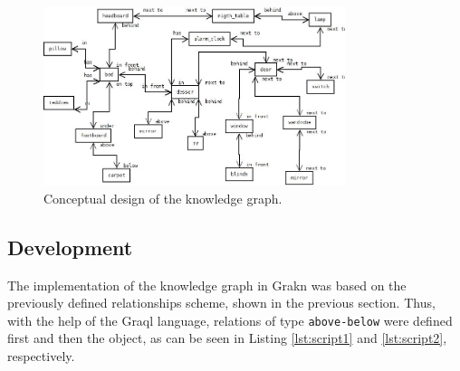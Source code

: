 \begin{figure}[H]
    \centering
    \includegraphics[width=8.8cm]{figures/grafo.jpg}
    \caption{Conceptual design of the knowledge graph.}
    \label{fig:grafo}
\end{figure}

\subsection{Development}

The implementation of the knowledge graph in Grakn was based on the previously 
defined relationships scheme, shown in the previous section. Thus, with the 
help of the Graql language, relations of type \texttt{above-below} were defined 
first and then the object, as can be seen in Listing \ref{lst:script1} and 
\ref{lst:script2}, respectively.





